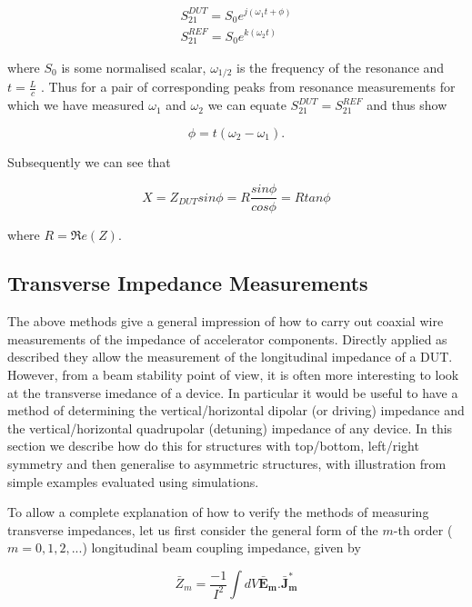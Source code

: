 \begin{align}
S_{21}^{DUT} = S_{0}e^{j \left( \omega_{1}t + \phi \right)} \\
S_{21}^{REF} = S_{0}e^{k \left( \omega_{2}t \right)}
\end{align}

where $S_{0}$ is some normalised scalar, $\omega_{1/2}$ is the frequency of the resonance and $t = \frac{L}{c}$ . Thus for a pair of corresponding peaks from resonance measurements for which we have measured $\omega_{1}$ and $\omega_{2}$ we can equate $S_{21}^{DUT} = S_{21}^{REF}$ and thus show

\begin{equation}
\phi = t \left( \omega_{2} - \omega_{1} \right).
\end{equation}

Subsequently we can see that

\begin{equation}
X = Z_{DUT} sin \phi = R \frac {sin \phi}{cos \phi} = R tan \phi
\end{equation}

where $R = \Re e(Z)$.

\subsection{Transverse Impedance Measurements}

The above methods give a general impression of how to carry out coaxial wire measurements of the impedance of accelerator components. Directly applied as described they allow the measurement of the longitudinal impedance of a DUT. However, from a beam stability point of view, it is often more interesting to look at the transverse imedance of a device. In particular it would be useful to have a method of determining the vertical/horizontal dipolar (or driving) impedance and the vertical/horizontal quadrupolar (detuning) impedance of any device. In this section we describe how do this for structures with top/bottom, left/right symmetry and then generalise to asymmetric structures, with illustration from simple examples evaluated using simulations.

To allow a complete explanation of how to verify the methods of measuring transverse impedances, let us first consider the general form of the $m$-th order ($m = 0, 1, 2,...$) longitudinal beam coupling impedance, given by \cite{Chao:PhysColEff, Tsutsui:OnSingleWire}

\begin{equation}
\bar{Z}_{m} = \frac{-1}{I^{2}} \int dV \mathbf{\bar{E}_{m}. \bar{J}_{m}^{*}}
\end{equation}

